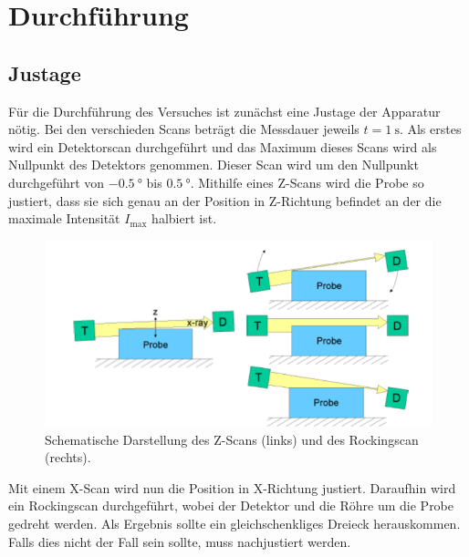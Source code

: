 \section{Durchführung}
\label{sec:Durchführung}
\subsection{Justage}
Für die Durchführung des Versuches ist zunächst eine Justage der Apparatur nötig. Bei den verschieden Scans beträgt die Messdauer jeweils $t=\SI{1}{\second}$. Als erstes wird ein Detektorscan durchgeführt und das Maximum dieses Scans wird als Nullpunkt des Detektors genommen. Dieser Scan wird um den Nullpunkt durchgeführt von $\SI{-0.5}{\degree}$ bis $\SI{0.5}{\degree}$. Mithilfe eines Z-Scans wird die Probe so justiert, dass sie sich genau an der Position in Z-Richtung befindet an der die maximale Intensität $I_\mathrm{max}$ halbiert ist.
\begin{figure}[h!]
  \centering
  \includegraphics[scale=0.6]{fig/zscan.png}
  \caption{Schematische Darstellung des Z-Scans (links) und des Rockingscan (rechts). \cite[5]{Anleitung4}}
  \label{fig:zscanbei}
\end{figure}
\FloatBarrier
\noindent Mit einem X-Scan wird nun die Position in X-Richtung justiert.
Daraufhin wird ein Rockingscan durchgeführt, wobei der Detektor und die Röhre um die Probe gedreht werden. Als Ergebnis sollte ein gleichschenkliges Dreieck herauskommen. Falls dies nicht der Fall sein sollte, muss nachjustiert werden.

